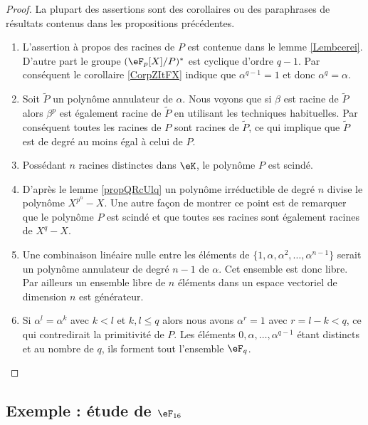 \begin{proof}
    La plupart des assertions sont des corollaires ou des paraphrases de résultats contenus dans les propositions précédentes.
    \begin{enumerate}
        \item
            L'assertion à propos des racines de \( P\) est contenue dans le lemme \ref{Lembcerei}. D'autre part le groupe \( (\eF_p[X]/P)^*\) est cyclique d'ordre \( q-1\). Par conséquent le corollaire \ref{CorpZItFX} indique que \( \alpha^{q-1}=1\) et donc \( \alpha^q=\alpha\).
        \item
            Soit \( \tilde P\) un polynôme annulateur de \( \alpha\). Nous voyons que si \( \beta\) est racine de \( \tilde P\) alors \( \beta^p\) est également racine de \( \tilde P\) en utilisant les techniques habituelles. Par conséquent toutes les racines de \( P\) sont racines de \( \tilde P\), ce qui implique que \( \tilde P\) est de degré au moins égal à celui de \( P\).
        \item
            Possédant \( n\) racines distinctes dans \( \eK\), le polynôme \( P\) est scindé.
        \item
            D'après le lemme \ref{propQRcUlq} un polynôme irréductible de degré \( n\) divise le polynôme \( X^{p^n}-X\). Une autre façon de montrer ce point est de remarquer que le polynôme \( P\) est scindé et que toutes ses racines sont également racines de \( X^q-X\).
        \item
            Une combinaison linéaire nulle entre les éléments de \( \{ 1,\alpha,\alpha^2,\ldots, \alpha^{n-1} \}\) serait un polynôme annulateur de degré \( n-1\) de \( \alpha\). Cet ensemble est donc libre. Par ailleurs un ensemble libre de \( n\) éléments dans un espace vectoriel de dimension \( n\) est générateur.
        \item
            Si \( \alpha^l=\alpha^k\) avec \( k<l\) et \( k,l\leq q\) alors nous avons \( \alpha^r=1\) avec \( r=l-k<q\), ce qui contredirait la primitivité de \( P\). Les éléments \( 0,\alpha,\ldots, \alpha^{q-1}\) étant distincts et au nombre de \( q\), ils forment tout l'ensemble \( \eF_q\).

    \end{enumerate}
\end{proof}

\subsection{Exemple : étude de \texorpdfstring{$\eF_{16}$}{F16}}

